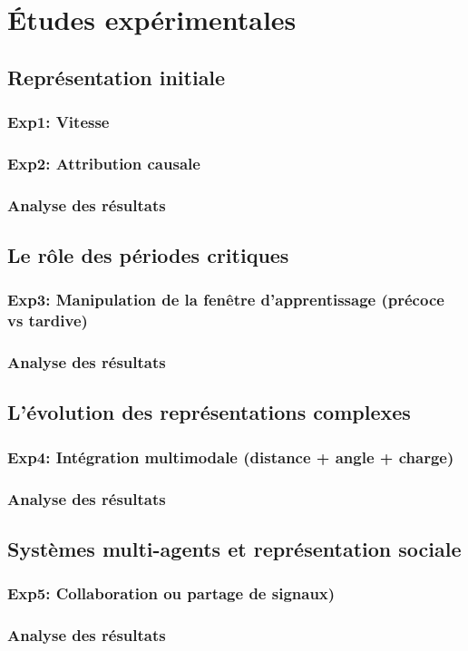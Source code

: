 \chapter{Études expérimentales}

\section{Représentation initiale}
\subsection{Exp1: Vitesse}
\subsection{Exp2: Attribution causale}
\subsection{Analyse des résultats}

\section{Le rôle des périodes critiques}
\subsection{Exp3: Manipulation de la fenêtre d'apprentissage (précoce vs tardive)}
\subsection{Analyse des résultats}

\section{L'évolution des représentations complexes}
\subsection{Exp4: Intégration multimodale (distance + angle + charge)}
\subsection{Analyse des résultats}


\section{Systèmes multi-agents et représentation sociale}
\subsection{Exp5: Collaboration ou partage de signaux)}
\subsection{Analyse des résultats}